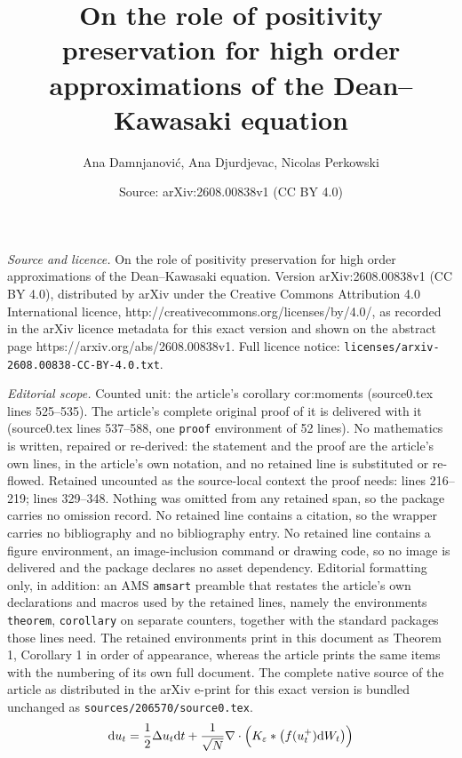 \documentclass[10pt,a4paper]{amsart}
\title{On the role of positivity preservation for high order approximations of the Dean--Kawasaki equation}
\author{Ana Damnjanovi\'c, Ana Djurdjevac, Nicolas Perkowski}
\date{Source: arXiv:2608.00838v1 (CC BY 4.0)}
\newcommand{\mathd}{\mathrm{d}}
\begin{document}
\maketitle

\noindent\emph{Source and licence.} On the role of positivity preservation for high order approximations of the Dean--Kawasaki equation. Version arXiv:2608.00838v1 (CC BY 4.0), distributed by arXiv under the Creative Commons Attribution 4.0 International licence, http://creativecommons.org/licenses/by/4.0/, as recorded in the arXiv licence metadata for this exact version and shown on the abstract page https://arxiv.org/abs/2608.00838v1. Full licence notice: \texttt{licenses/arxiv-2608.00838-CC-BY-4.0.txt}.\par\smallskip

\noindent\textit{Editorial scope.} Counted unit: the article's corollary cor:moments (source0.tex lines 525--535). The article's complete original proof of it is delivered with it (source0.tex lines 537--588, one \texttt{proof} environment of 52 lines). No mathematics is written, repaired or re-derived: the statement and the proof are the article's own lines, in the article's own notation, and no retained line is substituted or re-flowed.  Retained uncounted as the source-local context the proof needs: lines 216--219; lines 329--348.  Nothing was omitted from any retained span, so the package carries no omission record.  No retained line contains a citation, so the wrapper carries no bibliography and no bibliography entry.  No retained line contains a figure environment, an image-inclusion command or drawing code, so no image is delivered and the package declares no asset dependency.  Editorial formatting only, in addition: an AMS \texttt{amsart} preamble that restates the article's own declarations and macros used by the retained lines, namely the environments \texttt{theorem}, \texttt{corollary} on separate counters, together with the standard packages those lines need.  The retained environments print in this document as Theorem 1, Corollary 1 in order of appearance, whereas the article prints the same items with the numbering of its own full document.  The complete native source of the article as distributed in the arXiv e-print for this exact version is bundled unchanged as \texttt{sources/206570/source0.tex}.
\begin{equation}\label{eq:reg_DK}
     \mathd u_t = \frac{1}{2} \Delta u_t \mathd t + \frac{1}{\sqrt{N}} \nabla
   \cdot \Bigl(K_{\varepsilon} \ast \left(f (u_t^+) \mathd W_t\right) \Bigr)
\end{equation}
\end{document}
